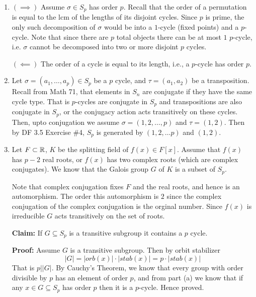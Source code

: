 \documentclass[12pt]{article}
\begin{document}
\begin{solution}
    \bbni 
    \begin{enumerate}
        \item[(a)] $(\implies)$
        Assume $\sigma \in S_p$ has order $p$. Recall that the order of a permutation is equal to the lcm of the lengths of its disjoint cycles. Since $p$ is prime, the only such decomposition of $\sigma$ would be into a $1$-cycle (fixed points) and a $p$-cycle. Note that since there are $p$ total objects there can be at most $1$ $p$-cycle, i.e. $\sigma$ cannot be decomposed into two or more disjoint $p$ cycles.
        

        $(\impliedby)$
        The order of a cycle is equal to its length, i.e., a $p$-cycle has order $p$. 

        \item[(b)] Let $\sigma = (a_1, \ldots, a_p) \in S_p$ be a $p$ cycle, and $\tau = (a_1, a_2)$ be a transposition.
        Recall from Math 71, that elements in $S_n$ are conjugate if they have the same cycle type. That is $p$-cycles are conjugate in $S_p$ and transpositions are also conjugate in $S_p$, or the conjugacy action acts transitively on these cycles. Then, upto conjugation we assume $\sigma = (1, 2, \ldots, p)$ and $\tau = (1, 2)$. Then by DF 3.5 Exercise \#4, $S_p$ is generated by $(1, 2, \ldots p)$ and $(1,2)$. 
        
        \item [(c)] Let $F \subset \mathbb R$, $K$ be the splitting field of $f(x) \in F[x]$. Assume that $f(x)$ has $p-2$ real roots, or $f(x)$ has two complex roots (which are complex conjugates). We know that the Galois group $G$ of $K$ is a subset of $S_p$. 
        
        Note that complex conjugation fixes $F$ and the real roots, and hence is an automorphism. The order this automorphism is $2$ since the complex conjugation of the complex conjugation is the orginal number. Since $f(x)$ is irreducible $G$ acts transitively on the set of roots. 
        
        \textbf{Claim:} If $G \subseteq S_p$ is a transitive subgroup it contains a $p$ cycle.

        \textbf{Proof:} Assume $G$ is a transitive subgroup. Then by orbit stabilizer 
        \[|G| = |orb(x)| \cdot |stab(x)| = p \cdot |stab(x)|\]
        That is $p \big | |G|$. By Cauchy's Theorem, we know that every group with order divisible by $p$ has an element of order $p$, and from part (a) we know that if any $x \in G \subseteq S_p$ has order $p$ then it is a $p$-cycle. 
        Hence proved. 


\end{enumerate}
\end{solution}
\end{document}
